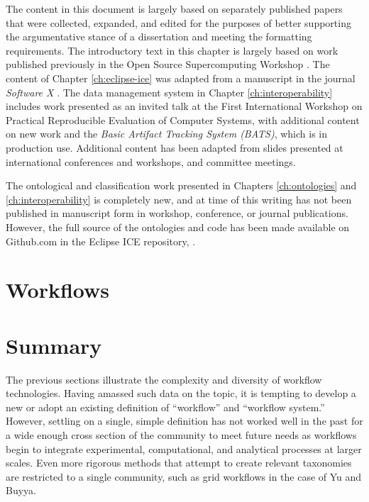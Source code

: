 The content in this document is largely based on separately published papers
that were collected, expanded, and edited for the purposes of better supporting
the argumentative stance of a dissertation and meeting the formatting
requirements. The introductory text in this chapter is largely based on
work published previously in the Open Source Supercomputing Workshop
\cite{billings_toward_2017}. The content of Chapter \ref{ch:eclipse-ice} was
adapted from a manuscript in the journal \textit{Software X}
\cite{billings_eclipse_2017}. The data management system in Chapter
\ref{ch:interoperability} includes work presented as an invited talk at the First
International Workshop on Practical Reproducible Evaluation of Computer
Systems, with additional content on new work and the \textit{Basic Artifact
Tracking System (BATS)}, which is in production use. Additional content has
been adapted from slides presented at international conferences and workshops,
and committee meetings.

The ontological and classification work presented in Chapters
\ref{ch:ontologies} and \ref{ch:interoperability} is completely new, and at
time of this writing has not been published in manuscript form in
workshop, conference, or journal publications. However, the full source of the
ontologies and code has been made available on Github.com in the Eclipse ICE repository,
\cite{billings_ice}.


\section{Workflows}


\section{Summary}

The previous sections illustrate the complexity and diversity of workflow
technologies. Having amassed such data on the topic, it is tempting to develop
a new or adopt an existing definition of ``workflow'' and ``workflow system.''
However, settling on a single, simple definition has not worked well in the past
for a wide enough cross section of the community to meet future needs as workflows
begin to integrate experimental, computational, and analytical processes at
larger scales. Even more rigorous methods that attempt to create relevant
taxonomies are restricted to a single community, such as grid workflows in the
case of Yu and Buyya.


